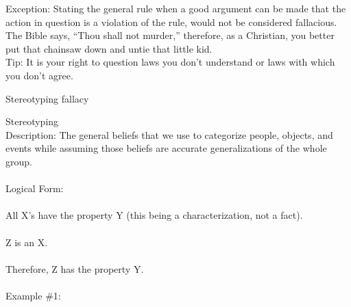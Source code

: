 \documentclass[a4paper,12pt,single,pdftex]{scrbook}
\begin{document}
{    
      Exception: Stating the general rule when a good argument can be made that the action in question is a violation of the rule, would not be considered fallacious.
    \\

    
      The Bible says, “Thou shall not murder,” therefore, as a Christian, you better put that chainsaw down and untie that little kid.
    \\

    
      Tip: It is your right to question laws you don’t understand or laws with which you don’t agree. 
    \\

  }


Stereotyping fallacy
    
      Stereotyping
    \\

    
      Description: The general beliefs that we use to categorize people, objects, and events while assuming those beliefs are accurate generalizations of the whole group.
    \\

    
      
    \\

    
      Logical Form:
    \\

    
      
    \\

    
      All X’s have the property Y (this being a characterization, not a fact).
    \\

    
      
    \\

    
      Z  is an X.
    \\

    
      
    \\

    
      Therefore, Z has the property Y.
    \\

    
      
    \\

    
      Example \#1:
    \\

    
      
    \\
\end{document}
